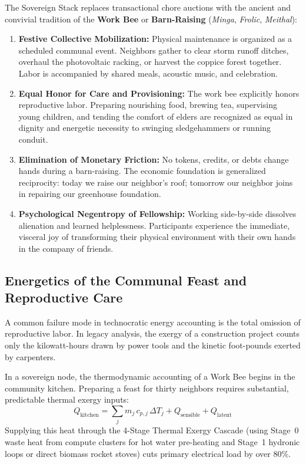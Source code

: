The Sovereign Stack replaces transactional chore auctions with the ancient and convivial tradition of the \textbf{Work Bee} or \textbf{Barn-Raising} (\textit{Minga}, \textit{Frolic}, \textit{Meithal}):
\begin{enumerate}
    \item \textbf{Festive Collective Mobilization:} Physical maintenance is organized as a scheduled communal event. Neighbors gather to clear storm runoff ditches, overhaul the photovoltaic racking, or harvest the coppice forest together. Labor is accompanied by shared meals, acoustic music, and celebration.
    \item \textbf{Equal Honor for Care and Provisioning:} The work bee explicitly honors reproductive labor. Preparing nourishing food, brewing tea, supervising young children, and tending the comfort of elders are recognized as equal in dignity and energetic necessity to swinging sledgehammers or running conduit.
    \item \textbf{Elimination of Monetary Friction:} No tokens, credits, or debts change hands during a barn-raising. The economic foundation is generalized reciprocity: today we raise our neighbor's roof; tomorrow our neighbor joins in repairing our greenhouse foundation.
    \item \textbf{Psychological Negentropy of Fellowship:} Working side-by-side dissolves alienation and learned helplessness. Participants experience the immediate, visceral joy of transforming their physical environment with their own hands in the company of friends.
\end{enumerate}

\subsection{Energetics of the Communal Feast and Reproductive Care}
A common failure mode in technocratic energy accounting is the total omission of reproductive labor. In legacy analysis, the exergy of a construction project counts only the kilowatt-hours drawn by power tools and the kinetic foot-pounds exerted by carpenters. 

In a sovereign node, the thermodynamic accounting of a Work Bee begins in the community kitchen. Preparing a feast for thirty neighbors requires substantial, predictable thermal exergy inputs:
\begin{equation}
Q_{\mathrm{kitchen}} = \sum_{j} m_j \, c_{p,j} \, \Delta T_j + Q_{\mathrm{sensible}} + Q_{\mathrm{latent}}
\label{eq:kitchen_exergy}
\end{equation}
Supplying this heat through the 4-Stage Thermal Exergy Cascade (using Stage~0 waste heat from compute clusters for hot water pre-heating and Stage~1 hydronic loops or direct biomass rocket stoves) cuts primary electrical load by over $80\%$. 

